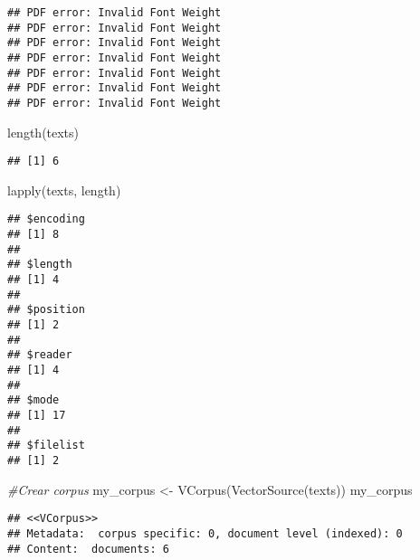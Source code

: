 \documentclass[
]{book}
\newenvironment{Shaded}{\begin{snugshade}}{\end{snugshade}}
\newcommand{\CommentTok}[1]{\textcolor[rgb]{0.56,0.35,0.01}{\textit{#1}}}
\newcommand{\FunctionTok}[1]{\textcolor[rgb]{0.00,0.00,0.00}{#1}}
\newcommand{\NormalTok}[1]{#1}
\newcommand{\OtherTok}[1]{\textcolor[rgb]{0.56,0.35,0.01}{#1}}
\begin{document}
\begin{verbatim}
## PDF error: Invalid Font Weight
## PDF error: Invalid Font Weight
## PDF error: Invalid Font Weight
## PDF error: Invalid Font Weight
## PDF error: Invalid Font Weight
## PDF error: Invalid Font Weight
## PDF error: Invalid Font Weight
\end{verbatim}

\begin{Shaded}
\begin{Highlighting}[]
\FunctionTok{length}\NormalTok{(texts)}
\end{Highlighting}
\end{Shaded}

\begin{verbatim}
## [1] 6
\end{verbatim}

\begin{Shaded}
\begin{Highlighting}[]
\FunctionTok{lapply}\NormalTok{(texts, length)}
\end{Highlighting}
\end{Shaded}

\begin{verbatim}
## $encoding
## [1] 8
## 
## $length
## [1] 4
## 
## $position
## [1] 2
## 
## $reader
## [1] 4
## 
## $mode
## [1] 17
## 
## $filelist
## [1] 2
\end{verbatim}

\begin{Shaded}
\begin{Highlighting}[]
\CommentTok{\#Crear corpus}
\NormalTok{my\_corpus }\OtherTok{\textless{}{-}} \FunctionTok{VCorpus}\NormalTok{(}\FunctionTok{VectorSource}\NormalTok{(texts))}
\NormalTok{my\_corpus}
\end{Highlighting}
\end{Shaded}

\begin{verbatim}
## <<VCorpus>>
## Metadata:  corpus specific: 0, document level (indexed): 0
## Content:  documents: 6
\end{verbatim}
\end{document}
